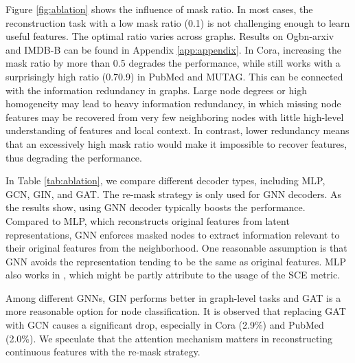 Figure \ref{fig:ablation} shows the influence of mask ratio. 
In most cases, the reconstruction task with a low mask ratio (0.1) is not challenging enough to learn useful features.
The optimal ratio varies across graphs. 
Results on Ogbn-arxiv and IMDB-B can be found in Appendix \ref{app:appendix}. 
In Cora, increasing the mask ratio by more than 0.5 degrades the performance, while \model still works with a surprisingly high ratio (0.70.9) in PubMed and MUTAG. 
This can be connected with the information redundancy in graphs. 
Large node degrees or high homogeneity may lead to heavy information redundancy, in which missing node features may be recovered from very few neighboring nodes with little high-level understanding of
features and local context. 
In contrast, lower redundancy means that an excessively high mask ratio would make it impossible to recover features, thus degrading the performance. 









In Table \ref{tab:ablation}, we compare different decoder types, including MLP, GCN, GIN, and GAT. The re-mask strategy is only used for GNN decoders. As the results show, using GNN decoder typically boosts the performance. Compared to MLP, which reconstructs original features from latent representations, GNN enforces masked nodes to extract information relevant to their original features from the neighborhood. One reasonable assumption is that GNN avoids the representation tending to be the same as original features.
MLP also works in \model, which might be partly attribute to the usage of the SCE metric.


Among different GNNs, GIN performs better in graph-level tasks and GAT is a more reasonable option for node classification. It is observed that replacing GAT with GCN causes a significant drop, especially in Cora (2.9\%) and PubMed (2.0\%). 
We speculate that the attention mechanism matters in reconstructing continuous features with the re-mask strategy.












